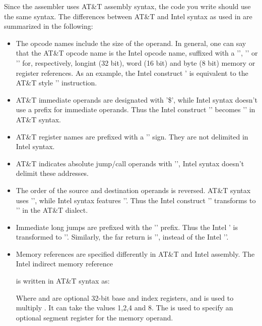 Since the \gnu assembler uses AT\&T assembly syntax, the code you write should
use the same syntax. The differences between AT\&T and Intel syntax as used
in \tp are summarized in the following:
\begin{itemize}
\item The opcode names include the size of the operand. In general, one can
say that the AT\&T opcode name is the Intel opcode name, suffixed with a
'', '' or '' for, respectively, longint (32 bit),
word (16 bit) and byte (8 bit) memory or register references. As an example,
the Intel construct \mbox{'} is equivalent to the AT\&T style '' instruction.
\item AT\&T immediate operands are designated with '\$', while Intel syntax
doesn't use a prefix for immediate operands. Thus the Intel construct
'' becomes '' in AT\&T syntax.
\item AT\&T register names are prefixed with a '\var{\%}' sign.
They are not delimited in Intel syntax.
\item AT\&T indicates absolute jump/call operands with '\var{*}', Intel
syntax doesn't delimit these addresses.
\item The order of the source and destination operands is reversed. AT\&T
syntax uses '', while Intel syntax features ''. Thus the Intel construct '' transforms to
'' in the AT\&T dialect.
\item Immediate long jumps are prefixed with the '' prefix. Thus the
Intel ' is transformed to ''. Similarly, the far return is '', instead of the
Intel ''.
\item Memory references are specified differently in AT\&T and Intel
assembly. The Intel indirect memory reference
\begin{quote}
\end{quote}
is written in AT\&T syntax as:
\begin{quote}
\end{quote}
Where  and  are optional 32-bit base and index
registers, and  is used to multiply . It can take the
values 1,2,4 and 8. The  is used to specify an optional segment
register for the memory operand.
\end{itemize}

